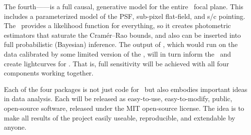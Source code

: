 \documentclass[letterpaper,12pt]{article}
\begin{document}
The fourth---\kpsf---is a full causal, generative model for the entire \Kepler\
focal plane.
This includes a parameterized model of the PSF, sub-pixel flat-field,
and s/c pointing.
The \kpsf\ provides a likelihood function for everything, so it
creates photometric estimators that saturate the Cram\'er--Rao bounds,
and also can
be inserted into full probabilistic (Bayesian) inference.
The output of \kpsf, which would run on the data calibrated by some limited
version of the \PLM, will in turn inform the \OWL\ and create lightcurves for
\George.
That is, full sensitivity will be achieved with all four components working
together.

Each of the four packages is not just code for \Kepler\ but also embodies
important ideas in data analysis.
Each will be released as easy-to-use, easy-to-modify, public, open-source
software, released under the MIT open-source license.
The idea is to make all results of the project easily useable, reproducible, and
extendable by anyone.
\end{document}
